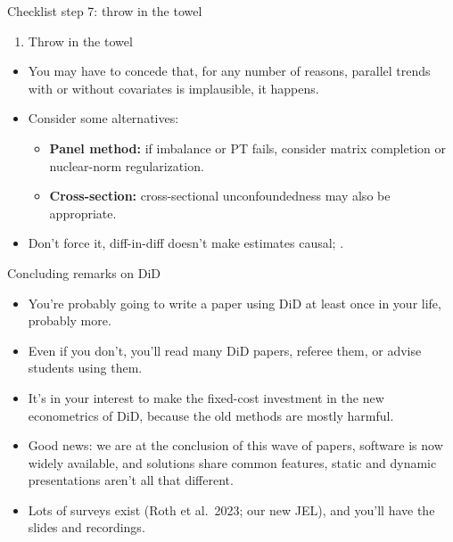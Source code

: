 \documentclass[aspectratio=169,11pt]{beamer}
\begin{document}
\begin{frame}{Checklist step 7: throw in the towel}
\vspace{0.4em}
\begin{enumerate}
\item[7.] Throw in the towel
\end{enumerate}
\vspace{0.3em}
\begin{itemize}\small\setlength\itemsep{0.4em}
  \item You may have to concede that, for any number of reasons, parallel trends with or without covariates is implausible, it happens.
  \item Consider some alternatives:
  \begin{itemize}\small
    \item \textbf{Panel method:} if imbalance or PT fails, consider matrix completion or nuclear-norm regularization.
    \item \textbf{Cross-section:} cross-sectional unconfoundedness may also be appropriate.
  \end{itemize}
  \item Don't force it, diff-in-diff doesn't make estimates causal; .
\end{itemize}
\end{frame}


\begin{frame}{Concluding remarks on DiD}
\vspace{0.3em}
\begin{itemize}\small\setlength\itemsep{0.45em}
  \item You're probably going to write a paper using DiD at least once in your life, probably more.
  \item Even if you don't, you'll read many DiD papers, referee them, or advise students using them.
  \item It's in your interest to make the fixed-cost investment in the new econometrics of DiD, because the old methods are mostly harmful.
  \item Good news: we are at the conclusion of this wave of papers, software is now widely available, and solutions share common features, static and dynamic presentations aren't all that different.
  \item Lots of surveys exist (Roth et al.\ 2023; our new JEL), and you'll have the slides and recordings.
\end{itemize}
\end{frame}
\end{document}
